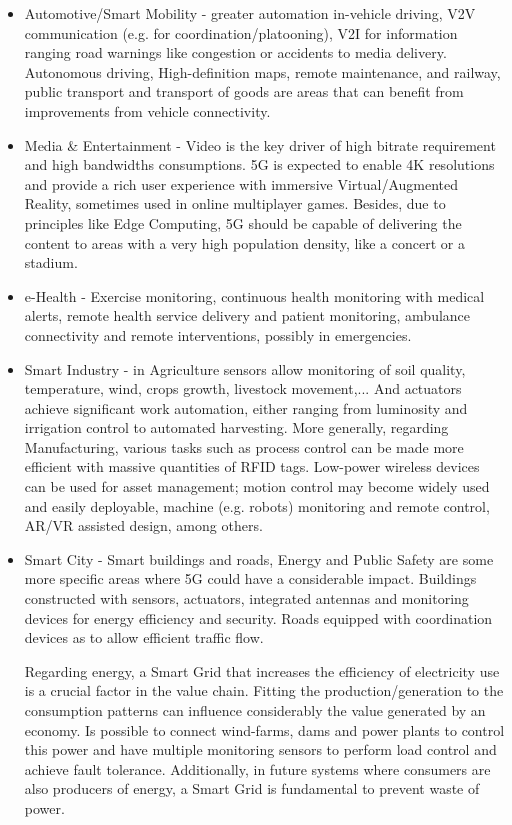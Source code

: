 \begin{itemize}
 \item Automotive/Smart Mobility - greater automation in-vehicle driving, \ac{V2V} communication (e.g. for coordination/platooning), \ac{V2I} for information ranging road warnings like congestion or accidents to media delivery. Autonomous driving, High-definition maps, remote maintenance, and railway, public transport and transport of goods are areas that can benefit from improvements from vehicle connectivity.
 
 \item Media \& Entertainment - Video is the key driver of high bitrate requirement and high bandwidths consumptions. \ac{5G} is expected to enable 4K resolutions and provide a rich user experience with immersive Virtual/Augmented Reality, sometimes used in online multiplayer games. Besides, due to principles like Edge Computing, \ac{5G} should be capable of delivering the content to areas with a very high population density, like a concert or a stadium.

 \item e-Health - Exercise monitoring, continuous health monitoring with medical alerts, remote health service delivery and patient monitoring, ambulance connectivity and remote interventions, possibly in emergencies.
 
 \item Smart Industry - in Agriculture sensors allow monitoring of soil quality, temperature, wind, crops growth, livestock movement,... And actuators achieve significant work automation, either ranging from luminosity and irrigation control to automated harvesting. More generally, regarding Manufacturing, various tasks such as process control can be made more efficient with massive quantities of RFID tags. Low-power wireless devices can be used for asset management; motion control may become widely used and easily deployable, machine (e.g. robots) monitoring and remote control, AR/VR assisted design, among others.
 
 \item Smart City - Smart buildings and roads, Energy and Public Safety are some more specific areas where 5G could have a considerable impact. Buildings constructed with sensors, actuators, integrated antennas and monitoring devices for energy efficiency and security. Roads equipped with coordination devices as to allow efficient traffic flow.
 
 Regarding energy, a Smart Grid that increases the efficiency of electricity use is a crucial factor in the value chain. Fitting the production/generation to the consumption patterns can influence considerably the value generated by an economy. Is possible to connect wind-farms, dams and power plants to control this power and have multiple monitoring sensors to perform load control and achieve fault tolerance. Additionally, in future systems where consumers are also producers of energy, a Smart Grid is fundamental to prevent waste of power. 
 

\end{itemize}
